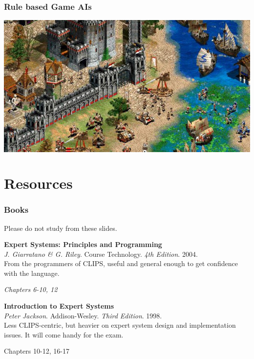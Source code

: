 \documentclass[xcolor={usenames,dvipsnames,svgnames}, compress]{beamer}
\begin{document}
  \begin{frame}
    \frametitle{Rule based Game AIs}
    \begin{center}
      \includegraphics[width=1.0\textwidth]{Figures/aokii-crop}
    \end{center}
  \end{frame}

  \section{Resources}
  {
    \begin{frame}
      \sectionpage
    \end{frame}
  }

  \begin{frame}
    \frametitle{Books}
    Please do not study from these slides.\par\bigskip
    
    
    \textbf{Expert Systems: Principles and Programming}\\
    \emph{J. Giarratano \& G. Riley}. Course Technology. \emph{4th
      Edition}. 2004.\\
    From the programmers of CLIPS, useful and general enough to get
    confidence with the language.
    \begin{flushright}
      \vspace{-5pt}
      \emph{Chapters 6-10, 12}
    \end{flushright}
    
    
    
    \textbf{Introduction to Expert Systems}\\
    \emph{Peter Jackson}. Addison-Wesley. \emph{Third Edition}. 1998.\\
    Less CLIPS-centric, but heavier on expert system design and
    implementation issues. It will come handy for the exam.
    \begin{flushright}
      \vspace{-5pt}
      Chapters 10-12, 16-17
    \end{flushright}
    
    
  \end{frame}
\end{document}
